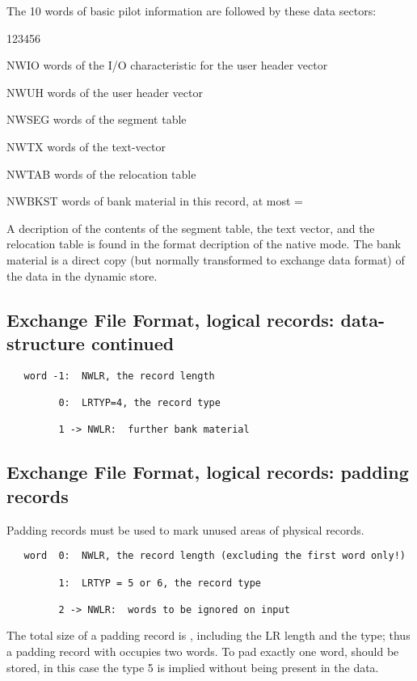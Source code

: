 The 10 words of basic pilot information are followed by
these data sectors:

\begin{DLtt}{123456}
\item[NWIO]   words of the I/O characteristic for the user header vector
\item[NWUH]   words of the user header vector
\item[NWSEG]  words of the segment table
\item[NWTX]   words of the text-vector
\item[NWTAB]  words of the relocation table
\item[NWBKST] words of bank material in this record, at most = 
\end{DLtt}

A decription of the contents of the segment table, the text vector,
and the relocation table is found in the format decription of the
native mode.
The bank material is a direct copy
(but normally transformed to exchange data format)
of the data in the dynamic store.

\subsection*{Exchange File Format, logical records: data-structure continued}

\begin{verbatim}
   word -1:  NWLR, the record length

         0:  LRTYP=4, the record type

         1 -> NWLR:  further bank material
\end{verbatim}

\subsection*{Exchange File Format, logical records: padding records}

Padding records must be used to mark unused areas of
physical records.

\begin{verbatim}
   word  0:  NWLR, the record length (excluding the first word only!)

         1:  LRTYP = 5 or 6, the record type

         2 -> NWLR:  words to be ignored on input
\end{verbatim}

The total size of a padding record is ,
including the LR length and the  type;
thus a padding record with  occupies two words.
To pad exactly one word,   should be stored,
in this case the  type 5 is implied
without being present in the data.

